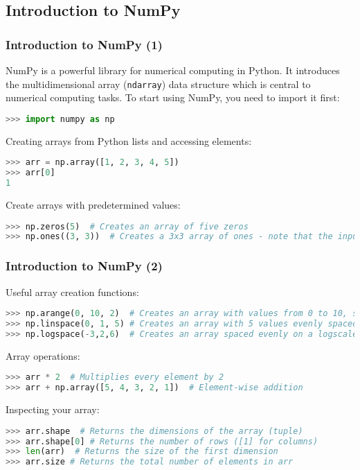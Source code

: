 \subsection{Introduction to NumPy}
\begin{frame}[fragile]
  \frametitle{Introduction to NumPy (1)}
  NumPy is a powerful library for numerical computing in Python. It introduces the multidimensional array (\lstinline|ndarray|) data structure which is central to numerical computing tasks. To start using NumPy, you need to import it first:
  \begin{lstlisting}[language=Python, numbers=none]
>>> import numpy as np
  \end{lstlisting}\pause
  Creating arrays from Python lists and accessing elements:
  \begin{lstlisting}[language=Python, numbers=none]
>>> arr = np.array([1, 2, 3, 4, 5])
>>> arr[0]
1
  \end{lstlisting}\pause
  Create arrays with predetermined values:
  \begin{lstlisting}[language=Python, numbers=none]
>>> np.zeros(5)  # Creates an array of five zeros
>>> np.ones((3, 3))  # Creates a 3x3 array of ones - note that the input argument is a tuple
  \end{lstlisting}
\end{frame}

\begin{frame}[fragile]
  \frametitle{Introduction to NumPy (2)}
  Useful array creation functions:
  \begin{lstlisting}[language=Python, numbers=none]
>>> np.arange(0, 10, 2)  # Creates an array with values from 0 to 10, step 2
>>> np.linspace(0, 1, 5) # Creates an array with 5 values evenly spaced between 0 and 1
>>> np.logspace(-3,2,6)  # Creates an array spaced evenly on a logscale
  \end{lstlisting}\pause
  Array operations:
  \begin{lstlisting}[language=Python, numbers=none]
>>> arr * 2  # Multiplies every element by 2
>>> arr + np.array([5, 4, 3, 2, 1])  # Element-wise addition
  \end{lstlisting}\pause
  Inspecting your array:
  \begin{lstlisting}[language=Python, numbers=none]
>>> arr.shape  # Returns the dimensions of the array (tuple)
>>> arr.shape[0] # Returns the number of rows ([1] for columns)
>>> len(arr)  # Returns the size of the first dimension
>>> arr.size # Returns the total number of elements in arr
  \end{lstlisting}
\end{frame}

